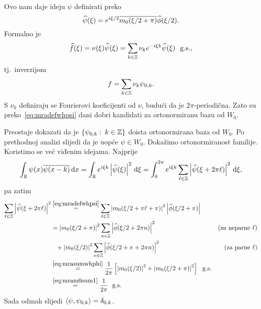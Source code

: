 \documentclass[main.tex]{subfiles}
\begin{document}
Ovo nam daje ideju \( \psi \) definirati preko
\begin{equation}\label{eq:mradefwhpsi}
	\widehat{\psi}(\xi) = e^{i\xi/2} \overline{m_0(\xi/2 + \pi)} \widehat{\phi}(\xi/2).
\end{equation}
Formalno je
\begin{equation}
	\widehat{f}(\xi) = \nu(\xi) \widehat{\psi}(\xi) = \sum_{k \in \mathbb{Z}} \nu_k e^{-i\xi k} \widehat{\psi}(\xi) \ \ \mathrm{g.s.},
\end{equation}
tj.\ inverzijom
\begin{equation}
	f = \sum_{k \in \mathbb{Z}} \nu_k \psi_{0,k}.
\end{equation}
S \( \nu_k \) definiraju se Fourierovi koeficijenti od \( \nu \),
budući da je \( 2\pi \)-periodična.
Zato su preko~\eqref{eq:mradefwhpsi} dani dobri
kandidati za ortonormiranu bazu od \( W_0 \).

Preostaje dokazati da je \( \left\{ \psi_{0,k} \, \colon \, k \in \mathbb{Z} \right\} \)
doista ortonormirana baza od \( W_0 \).
Po prethodnoj analizi slijedi da je uopće \( \psi \in W_0 \).
Dokažimo ortonormiranost familije.
Koristimo se već viđenim idejama. Najprije
\begin{align}
	\int_{\mathbb{R}} \psi(x) \overline{\psi(x-k)} \,\mathrm d x
	= \int_{\mathbb{R}} e^{i \xi k} \left| {\widehat{\psi}(\xi)} \right|^2 \,\mathrm d \xi
	= \int_0^{2\pi} e^{i\xi k} \sum_{\ell \in \mathbb{Z}} \left| {\widehat{\psi}(\xi + 2\pi\ell)} \right|^2 \,\mathrm d \xi,
\end{align}
pa zatim
\begin{align}
	\sum_{\ell \in \mathbb{Z}} \left| {\widehat{\psi}(\xi + 2\pi\ell)} \right|^2
	       & \stackrel{\scriptstyle {\eqref{eq:mradefwhpsi}}}{=}
	\sum_{\ell \in \mathbb{Z}} \left| {m_0(\xi/2 + \pi\ell + \pi)} \right|^2 \left| {\widehat{\phi}(\xi/2 + \pi)} \right|                \\
	       & = \left| {m_0(\xi/2 + \pi)} \right|^2 \sum_{n \in \mathbb{Z}} \left| {\widehat{\phi}(\xi/2 + 2\pi n)} \right|^2
	\qquad & (\text{za neparne } \ell)                                                               \\
	       & \phantom{=} + \left| {m_0(\xi/2)} \right|^2 \sum_{n \in \mathbb{Z}} \left| {\widehat{\phi}(\xi/2 + \pi + 2\pi n)} \right|^2
	\qquad & (\text{za parne } \ell)                                                                 \\
	       & \stackrel{\scriptstyle {\eqref{eq:mrasumwhphi}}}{=} \frac 1{2\pi}
	\left[ \left| {m_0(\xi/2)} \right|^2 + \left| {m_0(\xi/2 + \pi)} \right|^2 \right] \ \ \mathrm{g.s.}                             \\
	       & \stackrel{\scriptstyle {\eqref{eq:mram0sum1}}}{=}
	\frac 1{2\pi} \ \ \mathrm{g.s.}
\end{align}
Sada odmah slijedi \( \left\langle {\psi}, {\psi_{0,k}} \right\rangle = \delta_{0,k} \).
\end{document}
